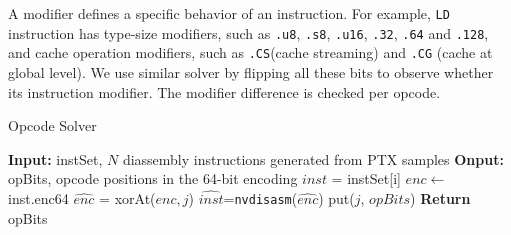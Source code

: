 A modifier defines a specific behavior of an instruction. 
For example, {\tt LD} instruction has type-size modifiers, such as {\tt .u8}, {\tt .s8}, {\tt .u16}, {\tt .32}, {\tt .64} and {\tt .128}, and cache operation modifiers, such as {\tt .CS}(cache streaming) and {\tt .CG} (cache at global level). 
We use similar solver by flipping all these bits to observe whether its instruction
modifier. The modifier difference is checked per opcode. %

\begin{algorithm}[htbp]
      \caption{Opcode Solver}\label{algo:opcode}
      {\small
      \begin{algorithmic}[1]
      \State \textbf {Input:} instSet, $N$ diassembly instructions generated from PTX samples
      \State \textbf {Onput:} opBits, opcode positions in the 64-bit encoding
      \State $inst$ = instSet[i]
      \State $enc \gets$ inst.enc64
      \State $\widehat{enc}$ = xorAt($enc, j$)
      \State $\widehat{inst}$={\tt nvdisasm}($\widehat{enc}$)
      \State put($j$, $opBits$)
      \EndIf
      \EndFor
      \EndFor
      \State \textbf{Return} opBits 
  \end{algorithmic}
  }
\end{algorithm}

